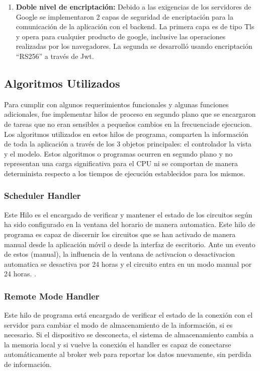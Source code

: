 \begin{enumerate}
	\item \textbf{Doble nivel de encriptación:} Debido a las exigencias de los servidores de Google se implementaron 2 capas de seguridad de encriptación para la  comunicación de la aplicación con el backend. La primera capa es de tipo Tls y opera para cualquier producto de google, inclusive las operaciones realizadas por los navegadores. La segunda se desarrolló usando encriptación ``RS256'' a través de Jwt.
\end{enumerate}

\subsection{Algoritmos Utilizados}

Para cumplir con algunos requerimientos funcionales y algunas funciones adicionales, fue implementar hilos de proceso en segundo plano que se encargaron de tareas que no eran sensibles a pequeños cambios en la frecuenciade ejecucion. Los algoritmos utilizados en estos hilos de programa, comparten la información de toda la aplicación a través de los 3 objetos principales: el controlador la vista y el modelo. Estos algoritmos o programas ocurren en segundo plano y no representan una carga significativa para el CPU ni se comportan de manera determinista respecto a los tiempos de ejecución establecidos para los mismos. 

\subsubsection{Scheduler Handler}
Este Hilo es el encargado de verificar y mantener el estado de los circuitos según ha sido configurado en la ventana del horario de manera automatica. Este hilo de programa es capaz de discernir los circuitos que se han activado de manera manual desde la aplicación móvil o desde la interfaz de escritorio. Ante un evento de estos (manual), la influencia de la ventana de activacion o desactivacion automatica se desactiva por 24 horas y el circuito entra en un modo manual por 24 horas.
.
\subsubsection{Remote Mode Handler}
Este hilo de programa está encargado de verificar el estado de la conexión con el servidor para cambiar el modo de almacenamiento de la información, si es necesario. Si el dispositivo se desconecta, el sistema de almacenamiento cambia a la memoria local y si vuelve la conexión el handler es capaz de conectarse automáticamente al broker web para reportar los datos nuevamente, sin perdida de información.

